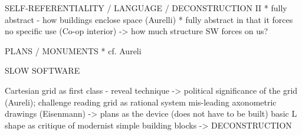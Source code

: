 SELF-REFERENTIALITY / LANGUAGE / DECONSTRUCTION II
* fully abstract - how buildings enclose space (Aurelli)
* fully abstract in that it forces no specific use (Co-op interior)
-> how much structure SW forces on us?

PLANS / MONUMENTS
* cf. Aureli


SLOW SOFTWARE

Cartesian grid as first class - reveal technique
-> political significance of the grid (Aureli); challenge reading grid as rational system
mis-leading axonometric drawings (Eisenmann)
-> plans as the device (does not have to be built)
basic L shape as critique of modernist simple building blocks
-> DECONSTRUCTION

\theendnotes
